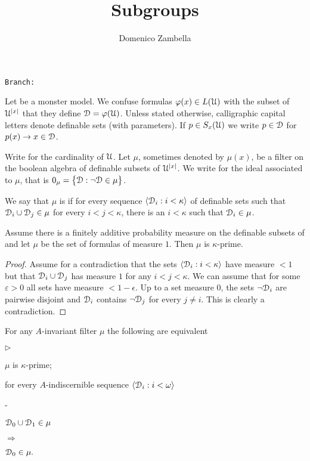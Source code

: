 \documentclass{amsproc}
\author{Domenico Zambella}
\newcommand{\mylabel}[1]{{#1}\hfill}
\renewenvironment{itemize}
  {\begin{list}{$\triangleright$}{%
  \setlength{\parskip}{0mm}
  \setlength{\topsep}{.4\baselineskip}
  \setlength{\rightmargin}{0mm}
  \setlength{\listparindent}{0mm}
  \setlength{\itemindent}{0mm}
  \setlength{\labelwidth}{3ex}
  \setlength{\itemsep}{.2\baselineskip}
  \setlength{\parsep}{.2\baselineskip}
  \setlength{\partopsep}{0mm}
  \setlength{\labelsep}{1ex}
  \setlength{\leftmargin}{\labelwidth+\labelsep}
  \let\makelabel\mylabel}}{%
\end{list}}
\renewcommand*{\emph}[1]{%
   \smash{\tikz[baseline]\node[rectangle, fill=teal!25, rounded corners, inner xsep=0.5ex, inner ysep=0.2ex, anchor=base, minimum height = 2.7ex]{\strut #1};}}
\newcommand\branch{}
\begin{document}
\title{Subgroups}
\hfill\texttt{Branch:\ \branch\ \DTMnow}
\maketitle
\raggedbottom

Let \emph{$\EuScript U$} be a monster model.
We confuse formulas $\varphi(x)\in L(\EuScript U)$ with the subset of $\EuScript U^{|x|}$ that they define $\EuScript D=\varphi(\EuScript U)$.
Unless stated otherwise, calligraphic capital letters denote definable sets (with parameters).
If $p\in S_x(\EuScript U)$ we write $p\in\EuScript D$ for $p(x)\rightarrow x\in\EuScript D$.

Write \emph{$\kappa$} for the cardinality of $\EuScript U$.
Let $\mu$, sometimes denoted by $\mu(x)$, be a filter on the boolean algebra of definable subsets of $\EuScript U^{|x|}$.
We write \emph{$0_\mu$} for the ideal associated to $\mu$, that is $0_\mu=\big\{\EuScript D:\neg\EuScript D\in\mu\big\}$.

We say that $\mu$ is \emph{$\kappa$-prime} if for every sequence $\langle\EuScript D_i:i<\kappa\rangle$ of definable sets such that $\EuScript D_i\cup \EuScript D_j\in\mu$ for every $i<j<\kappa$, there is an $i<\kappa$ such that $\EuScript D_i\in\mu$.

\begin{fact}
  Assume there is a finitely additive probability measure on the definable subsets of  and let $\mu$ be the set of formulas of measure $1$.
  Then $\mu$ is $\kappa$-prime.
\end{fact}

\begin{proof}
  Assume for a contradiction that the sets $\langle\EuScript D_i:i<\kappa\rangle$ have measure $<1$ but that $\EuScript D_i\cup \EuScript D_j$ has measure $1$ for any $i<j<\kappa$. 
  We can assume that for some $\varepsilon>0$ all sets have measure $<1-\epsilon$.
  Up to a set measure $0$, the sets  $\neg\EuScript D_i$ are pairwise disjoint and $\EuScript D_i$ contains  $\neg\EuScript D_j$ for every $j\neq i$.
  This is clearly a contradiction.
\end{proof}



\def\ceq#1#2#3{\parbox[t]{25ex}{$\displaystyle #1$}\parbox{6ex}{\hfil $#2$}{$\displaystyle #3$}}

\begin{fact}
  For any $A$-invariant filter $\mu$ the following are equivalent
  \begin{itemize}
    \item[1.] $\mu$ is $\kappa$-prime;
    \item[2.] for every $A$-indiscernible sequence $\langle\EuScript D_i:i<\omega\rangle$
    
    \noindent\kern-\leftmargin
    \ceq{\hfill\EuScript D_0\cup\EuScript D_1\in\mu}{\Rightarrow}{\EuScript D_0\in\mu.}
  \end{itemize}
\end{fact}
\end{document}
